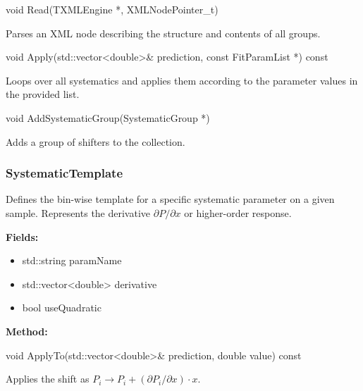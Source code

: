 \begin{description}[align=left, labelsep=0.6em]

  \item[] {\color{cadmiumred} void Read(TXMLEngine *, XMLNodePointer\_t)}

  Parses an XML node describing the structure and contents of all groups.

  \item[] {\color{cadmiumred} void Apply(std::vector<double>\& prediction, const FitParamList *) const}

  Loops over all systematics and applies them according to the parameter values in the provided list.

  \item[] {\color{cadmiumred} void AddSystematicGroup(SystematicGroup *)}

  Adds a group of shifters to the collection.

\end{description}

\vspace{1em}
\subsubsection*{\color{cadmiumgreen}\bf SystematicTemplate}

Defines the bin-wise template for a specific systematic parameter on a given sample.  
Represents the derivative $\partial P / \partial x$ or higher-order response.

\noindent\textbf{Fields:}

\begin{itemize}
  \item {\color{amber}std::string paramName}
  \item {\color{amber}std::vector<double>} derivative
  \item {\color{amber}bool} useQuadratic
\end{itemize}

\noindent\textbf{Method:}

\begin{description}[align=left]

  \item[] {\color{cadmiumred} void ApplyTo(std::vector<double>\& prediction, double value) const}

  Applies the shift as $P_i \rightarrow P_i + (\partial P_i/\partial x) \cdot x$.

\end{description}

